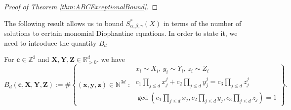 \begin{proof}[Proof of Theorem \ref{thm:ABCExceptionalBound}]
  \end{proof}


The following result allows us to bound $S^*_{\alpha,\beta,\gamma}(X)$
in terms of the number of solutions to certain monomial Diophantine equations. In order to state it, we need to introduce the quantity $B_d$
\begin{definition}\label{def:BdDiophantineCount}
  \leanok
For $\mathbf{c}\in \mathbb{Z}^3$ and $\mathbf{X},\mathbf{Y},\mathbf{Z}\in \mathbb{R}_{>0}^{d}$. we have
\begin{equation}\label{eq:Bk}
B_d(\mathbf{c},\mathbf{X},\mathbf{Y},\mathbf{Z}) := \#\left\{(\mathbf{x},\mathbf{y},\mathbf{z})\in \mathbb{N}^{3d}\;:\;
\begin{array}{l}
x_i\sim X_i,\,y_i\sim Y_i,\,z_i\sim Z_i \\
c_1\prod_{j\leq d}x_j^j+c_2\prod_{j\leq d}y_j^j=c_3\prod_{j\leq d}z_j^j\\
\gcd(c_1\prod_{j\leq d}x_j,c_2\prod_{j\leq d}y_j ,
c_3\prod_{j\leq d}z_j)=1
\end{array}
\right\}.
\end{equation}
\end{definition}





